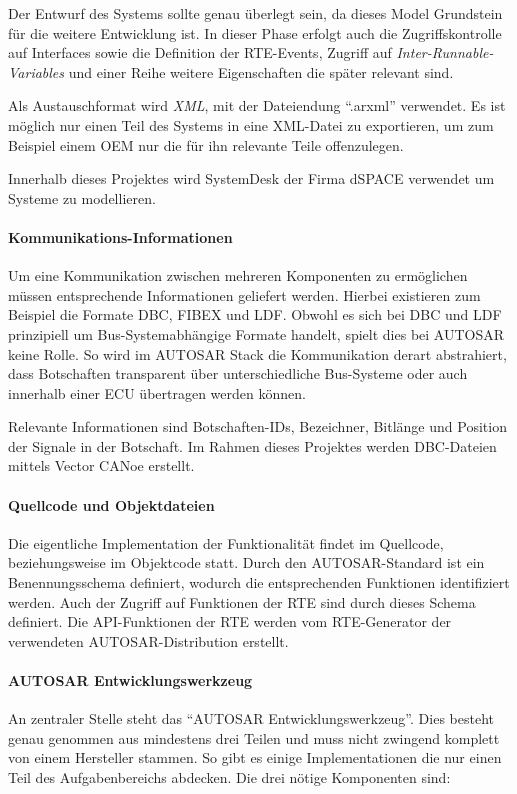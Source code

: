 \documentclass[
  a4paper,					    %
  twoside,
  DIV=calc,     				%
  bibliography=totoc,
  cleardoublepage=empty,
  ngerman,     					%
  final       					%
]{scrbook}
\begin{document}
Der Entwurf des Systems sollte genau überlegt sein, da dieses Model Grundstein für die weitere Entwicklung ist. In dieser Phase erfolgt auch die Zugriffskontrolle auf Interfaces sowie die Definition der RTE-Events, Zugriff auf \emph{Inter-Runnable-Variables} und einer Reihe weitere Eigenschaften die später relevant sind.

Als Austauschformat wird \emph{XML}, mit der Dateiendung "`.arxml"' verwendet. Es ist möglich nur einen Teil des Systems in eine XML-Datei zu exportieren, um zum Beispiel einem OEM nur die für ihn relevante Teile offenzulegen.

Innerhalb dieses Projektes wird SystemDesk der Firma dSPACE verwendet um Systeme zu modellieren.

\paragraph{Kommunikations-Informationen}
Um eine Kommunikation zwischen mehreren Komponenten zu ermöglichen müssen entsprechende Informationen geliefert werden. Hierbei existieren zum Beispiel die Formate DBC, FIBEX und LDF. Obwohl es sich bei DBC und LDF prinzipiell um Bus-Systemabhängige Formate handelt, spielt dies bei AUTOSAR keine Rolle. So wird im AUTOSAR Stack die Kommunikation derart abstrahiert, dass Botschaften transparent über unterschiedliche Bus-Systeme oder auch innerhalb einer ECU übertragen werden können.

Relevante Informationen sind Botschaften-IDs, Bezeichner, Bitlänge und Position der Signale in der Botschaft. Im Rahmen dieses Projektes werden DBC-Dateien mittels Vector CANoe erstellt.

\paragraph{Quellcode und Objektdateien}
Die eigentliche Implementation der Funktionalität findet im Quellcode, beziehungsweise im Objektcode statt. Durch den AUTOSAR-Standard ist ein Benennungsschema definiert, wodurch die entsprechenden Funktionen identifiziert werden. Auch der Zugriff auf Funktionen der RTE sind durch dieses Schema definiert. Die API-Funktionen der RTE werden vom RTE-Generator der verwendeten AUTOSAR-Distribution erstellt.

\paragraph{AUTOSAR Entwicklungswerkzeug}
An zentraler Stelle steht das "`AUTOSAR Entwicklungswerkzeug"'. Dies besteht genau genommen aus mindestens drei Teilen und muss nicht zwingend komplett von einem Hersteller stammen. So gibt es einige Implementationen die nur einen Teil des Aufgabenbereichs abdecken. Die drei nötige Komponenten sind:
\end{document}

